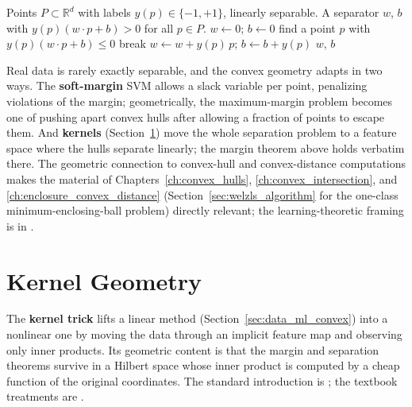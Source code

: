 \begin{algorithm}[htbp]
\caption{Perceptron on a Linearly Separable Set}
\label{alg:data_ml_perceptron}
\begin{algorithmic}[1]
\Require Points $P \subset \mathbb{R}^d$ with labels $y(p) \in \{-1, +1\}$, linearly separable.
\Ensure A separator $w$, $b$ with $y(p)(w \cdot p + b) > 0$ for all $p \in P$.
  \State $w \gets 0$; $b \gets 0$
  \Repeat
    \State find a point $p$ with $y(p)(w \cdot p + b) \leq 0$ 
     \State break \EndIf
    \State $w \gets w + y(p)\, p$; $b \gets b + y(p)$ 
  \State \Return $w$, $b$
\EndFunction
\end{algorithmic}
\end{algorithm}

Real data is rarely exactly separable, and the convex geometry adapts in
two ways. The \textbf{soft-margin} SVM allows a slack variable per point,
penalizing violations of the margin; geometrically, the maximum-margin
problem becomes one of pushing apart convex hulls after allowing a fraction
of points to escape them. And \textbf{kernels}
(Section~\ref{sec:data_ml_kernels}) move the whole separation problem to a
feature space where the hulls separate linearly; the margin theorem above
holds verbatim there. The geometric connection to convex-hull and
convex-distance computations makes the material of
Chapters~\ref{ch:convex_hulls}, \ref{ch:convex_intersection}, and
\ref{ch:enclosure_convex_distance} (Section~\ref{sec:welzls_algorithm} for
the one-class minimum-enclosing-ball problem) directly relevant; the
learning-theoretic framing is in \cite{bishop2006,duda2001,hastie2009}.


\section{Kernel Geometry}
\label{sec:data_ml_kernels}

The \textbf{kernel trick} lifts a linear method
(Section~\ref{sec:data_ml_convex}) into a nonlinear one by moving the data
through an implicit feature map and observing only inner products. Its
geometric content is that the margin and separation theorems survive in a
Hilbert space whose inner product is computed by a cheap function of the
original coordinates. The standard introduction is \cite{muller2001}; the
textbook treatments are \cite{bishop2006,hastie2009}.

